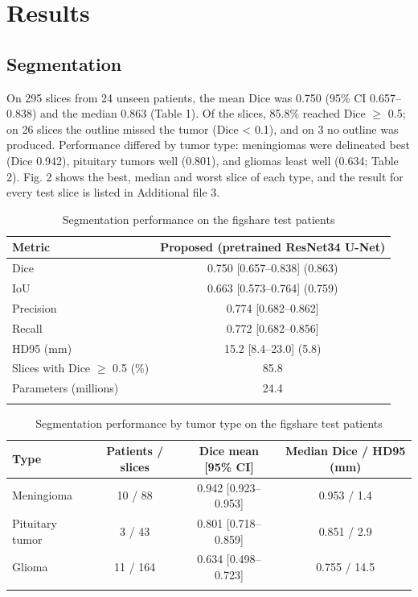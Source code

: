 \documentclass[pdflatex,sn-vancouver-num,iicol]{sn-jnl}
\begin{document}
\section{Results}\label{sec:results}

\subsection{Segmentation}

On 295 slices from 24 unseen patients, the mean Dice was 0.750 (95\% CI 0.657--0.838) and the median 0.863 (Table 1). Of the slices, 85.8\% reached Dice $\geq$ 0.5; on 26 slices the outline missed the tumor (Dice < 0.1), and on 3 no outline was produced. Performance differed by tumor type: meningiomas were delineated best (Dice 0.942), pituitary tumors well (0.801), and gliomas least well (0.634; Table 2). Fig. 2 shows the best, median and worst slice of each type, and the result for every test slice is listed in Additional file 3.

\begin{table}[!t]
\caption{Segmentation performance on the figshare test patients}\label{tab1}
\centering\footnotesize
\begin{tabular}{lc}
\toprule
Metric & Proposed (pretrained ResNet34 U-Net) \\
\midrule
Dice & 0.750 [0.657--0.838] (0.863) \\
IoU & 0.663 [0.573--0.764] (0.759) \\
Precision & 0.774 [0.682--0.862] \\
Recall & 0.772 [0.682--0.856] \\
HD95 (mm) & 15.2 [8.4--23.0] (5.8) \\
Slices with Dice $\geq$ 0.5 (\%) & 85.8 \\
Parameters (millions) & 24.4 \\
\botrule
\end{tabular}
\end{table}

\begin{table}[!t]
\caption{Segmentation performance by tumor type on the figshare test patients}\label{tab2}
\centering\footnotesize
\begin{tabular}{lccc}
\toprule
Type & Patients / slices & Dice mean [95\% CI] & Median Dice / HD95 (mm) \\
\midrule
Meningioma & 10 / 88 & 0.942 [0.923--0.953] & 0.953 / 1.4 \\
Pituitary tumor & 3 / 43 & 0.801 [0.718--0.859] & 0.851 / 2.9 \\
Glioma & 11 / 164 & 0.634 [0.498--0.723] & 0.755 / 14.5 \\
\botrule
\end{tabular}
\end{table}
\end{document}
